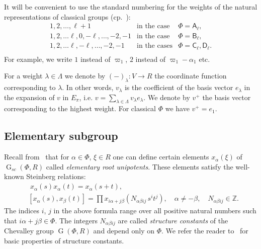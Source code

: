 \documentclass[12pt]{amsart}
\numberwithin{equation}{section}
\theoremstyle{definition}
\DeclareMathOperator{\G}{G}
\newcommand{\rA}{\mathsf{A}}
\newcommand{\rB}{\mathsf{B}}
\newcommand{\rC}{\mathsf{C}}
\newcommand{\rD}{\mathsf{D}}
\begin{document}
It will be convenient to use the standard numbering for the weights of the natural representations of classical groups (cp.~\cite[§1B]{St78}):
\[\begin{array}{cll}
  1,2,\ldots, \ell+1 & \text{in the case} & \Phi =\rA_\ell, \\
  1,2,\ldots \ell, 0, -\ell,\ldots, -2, -1 & \text{in the case} & \Phi =\rB_\ell, \\
  1,2,\ldots \ell, -\ell,\ldots, -2, -1 & \text{in the cases}   & \Phi =\rC_\ell, \rD_\ell. \\
\end{array}\]
For example, we write $1$ instead of $\varpi_1$, $2$ instead of $\varpi_1-\alpha_1$ etc.

For a weight $\lambda\in \Lambda$ we denote by $(-)_\lambda\colon V\to R$ the coordinate function corresponding to $\lambda$.
In other words,  $v_\lambda$ is the coefficient of the basis vector $e_\lambda$ in the expansion of $v$ in $E_\pi$, i.e. $v=\sum_{\lambda\in \Lambda} v_\lambda e_\lambda$.
We denote by $v^+$ the basis vector corresponding to the highest weight.
For classical $\Phi$ we have $v^+=e_1$.

\subsection{Elementary subgroup}\label{sec:elementary}
Recall from~\cite{St78, VP} that for $\alpha\in \Phi$, $\xi\in R$ one can define certain elements $x_{\alpha}(\xi)$ of $\G_{sc}(\Phi, R)$ called {\it elementary root unipotents}.
These elements satisfy the well-known Steinberg relations:
\begin{align}
& \phantom{[}
x_\alpha(s) x_\alpha(t) = x_\alpha(s+t), \label{rel:add}\\
& [x_\alpha(s),  x_\beta(t)] = \prod x_{i\alpha + j\beta}\left(N_{\alpha\beta ij}\, s^i t^j\right),\quad \alpha\neq-\beta, \quad N_{\alpha\beta ij}\in\mathbb{Z}. \label{rel:CCF}
\end{align} 
The indices $i$, $j$ in the above formula range over all positive natural numbers such that $i\alpha + j\beta\in\Phi$.
The integers $N_{\alpha\beta ij}$ are called {\it structure constants} of the Chevalley group $\G(\Phi,R)$ and depend only on $\Phi$.
We refer the reader to~\cite[\S14]{VP} for basic properties of structure constants.
\end{document}
